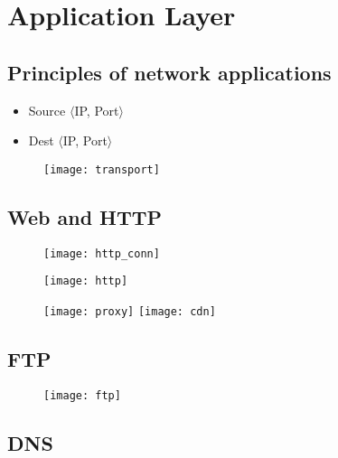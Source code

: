 \section{Application Layer}

\subsection{Principles of network applications}


\begin{itemize}
  \item Source $\langle$IP, Port$\rangle$
  \item Dest $\langle$IP, Port$\rangle$
\end{itemize}

\begin{figure}[H]
  \centering
  \texttt{[image: transport]}
\end{figure}

\subsection{Web and HTTP}

\begin{figure}[H]
  \centering
  \texttt{[image: http\_conn]}
\end{figure}

\begin{figure}[H]
  \centering
  \texttt{[image: http]}
\end{figure}

\begin{figure}[H]
  \centering
  \texttt{[image: proxy]}
  \texttt{[image: cdn]}
\end{figure}

\subsection{FTP}

\begin{figure}[H]
  \centering
  \texttt{[image: ftp]}
\end{figure}

\subsection{DNS}


